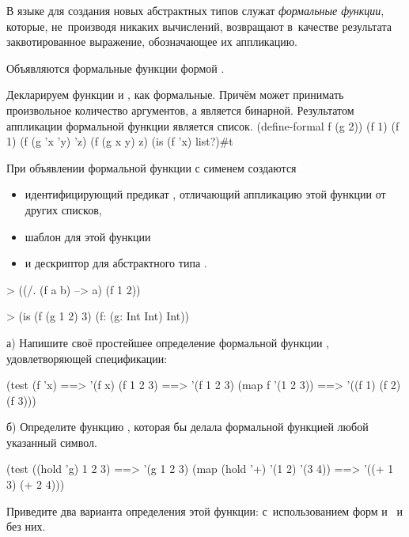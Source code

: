 В языке \Scheme для создания новых абстрактных типов служат \emph{формальные функции}, которые, не~производя никаких вычислений, возвращают в~качестве результата заквотированное выражение, обозначающее их аппликацию.

Объявляются формальные функции формой .

\begin{example}{%
Декларируем функции  и , как формальные. Причём  может принимать произвольное количество аргументов, а  является бинарной. Результатом аппликации формальной функции является список.}
\REPLin
  {(define-formal f (g 2))}
\REPL
  {(f 1)}
  {(f 1)}
\REPL
  {(f (g 'x 'y) 'z)}
  {(f (g x y) z)}
\REPL
  {(is (f 'x) list?)}{#t}
\end{example}

\begin{example}{%
При объявлении формальной функции с сименем  создаются
\begin{itemize}
\item идентифицирующий предикат , отличающий аппликацию этой функции от других списков, 
\item шаблон для этой функции  
\item и дескриптор для абстрактного типа .
\end{itemize}}
\smallskip
\begin{ExampleCode}
> ((/. (f a b) --> a) 
   (f 1 2))
\end{ExampleCode}
\smallskip
\begin{ExampleCode}
> (is (f (g 1 2) 3)
      (f: (g: Int Int) Int))
\end{ExampleCode}
\end{example}

\vspace{-\bigskipamount}
\begin{Assignment}
а) Напишите своё простейшее определение формальной функции , удовлетворяющей спецификации:
\begin{Specification}
(test 
  (f 'x)                ==> '(f x)
  (f 1 2 3)             ==> '(f 1 2 3)
  (map f '(1 2 3))      ==> '((f 1) (f 2) (f 3)))
\end{Specification}

б) Определите функцию , которая бы делала формальной функцией любой указанный символ. 
\begin{Specification}
(test 
 ((hold 'g) 1 2 3)             ==> '(g 1 2 3)
 (map (hold '+) '(1 2) '(3 4)) ==> '((+ 1 3) (+ 2 4)))
\end{Specification}

Приведите два варианта определения этой функции: с~использованием форм  и~ и без них.

\end{Assignment}

